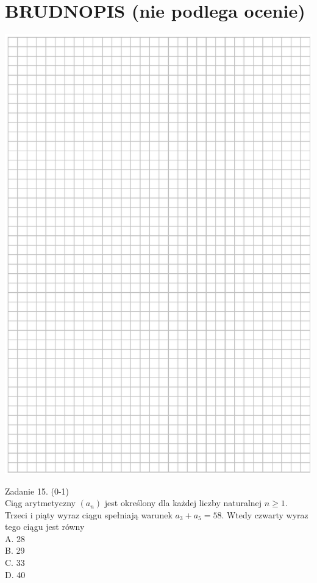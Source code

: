 \documentclass[10pt]{article}
\begin{document}
\section*{BRUDNOPIS (nie podlega ocenie)}
\begin{center}
\includegraphics[max width=\textwidth]{2024_11_21_46d945490f1b2eff1c8eg-07}
\end{center}

Zadanie 15. (0-1)\\
Ciąg arytmetyczny \(\left(a_{n}\right)\) jest określony dla każdej liczby naturalnej \(n \geq 1\). Trzeci i piąty wyraz ciągu spełniają warunek \(a_{3}+a_{5}=58\). Wtedy czwarty wyraz tego ciągu jest równy\\
A. 28\\
B. 29\\
C. 33\\
D. 40
\end{document}
